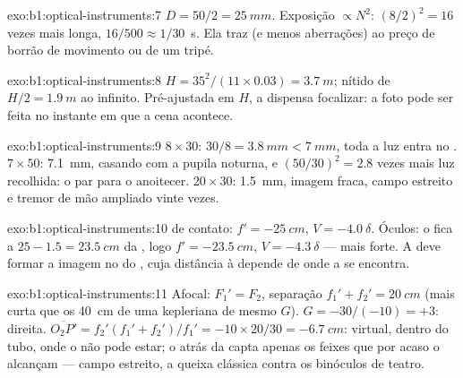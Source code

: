 \begin{solution}{exo:b1:optical-instruments:7}
$D = 50/2 = \qty{25}{mm}$. Exposição $\propto N^2$: $(8/2)^2 = 16$ vezes
mais longa, $16/500 \approx 1/30$~\unit{s}. Ela traz  (e
menos aberrações) ao preço de borrão de movimento ou de um tripé.
\end{solution}

\begin{solution}{exo:b1:optical-instruments:8}
$H = 35^2/(11 \times 0.03) = \qty{3.7}{m}$; nítido de $H/2 =
\qty{1.9}{m}$ ao infinito. Pré-ajustada em $H$, a  dispensa focalizar:
a foto pode ser feita no instante em que a cena acontece.
\end{solution}

\begin{solution}{exo:b1:optical-instruments:9}
$8\times30$:  $30/8 = \qty{3.8}{mm} < \qty{7}{mm}$, toda a luz
entra no . $7\times50$: \qty{7.1}{mm}, casando com a pupila noturna,
e $(50/30)^2 = 2.8$ vezes mais luz recolhida: o par para o anoitecer.
$20\times30$:  \qty{1.5}{mm}, imagem fraca, campo estreito e
tremor de mão ampliado vinte vezes.
\end{solution}

\begin{solution}{exo:b1:optical-instruments:10}
 de contato: $f' = \qty{-25}{cm}$, $V = \qty{-4.0}{\delta}$. Óculos:
o  fica a $25 - 1.5 = \qty{23.5}{cm}$ da , logo $f' =
\qty{-23.5}{cm}$, $V = \qty{-4.3}{\delta}$ --- mais forte. A  deve
formar a imagem no  do , cuja distância à 
depende de onde a  se encontra.
\end{solution}

\begin{solution}{exo:b1:optical-instruments:11}
Afocal: $F_1' = F_2$, separação $f_1' + f_2' = \qty{20}{cm}$ (mais curta
que os \qty{40}{cm} de uma kepleriana de mesmo $G$). $G = -30/(-10) =
+3$: direita.  $\overline{O_2P'} = f_2'(f_1' + f_2')/f_1' =
-10 \times 20/30 = \qty{-6.7}{cm}$: virtual, dentro do tubo, onde o
 não pode estar; o  atrás da  capta apenas os feixes que
por acaso o alcançam --- campo estreito, a queixa clássica contra os binóculos
de teatro.
\end{solution}

